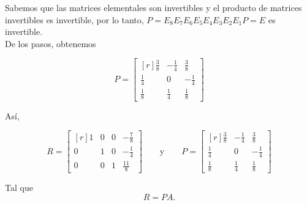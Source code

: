 \begin{enumerate}
	Sabemos que las matrices elementales son invertibles y el producto de matrices invertibles es invertible, por lo tanto, $P=E_8E_7E_6E_5E_4E_3E_2E_1P=E$ es invertible.\\

	De los pasos, obtenemos

	$$P=\begin{bmatrix*}[r]
	    \frac{3}{8} & -\frac{1}{4} & \frac{3}{8}\\
	    \frac{1}{4} & 0 & -\frac{1}{4}\\
	    \frac{1}{8} & \frac{1}{4} & \frac{1}{8}
	\end{bmatrix*}$$

	Así,

	$$R=\begin{bmatrix*}[r]
	    1 & 0 & 0 & -\frac{7}{8}\\
	    0 & 1 & 0 & -\frac{1}{4}\\
	    0 & 0 & 1 & \frac{11}{8}
	\end{bmatrix*} \qquad \mbox{y}\qquad 
	P=\begin{bmatrix*}[r]
	    \frac{3}{8} & -\frac{1}{4} & \frac{3}{8}\\
	    \frac{1}{4} & 0 & -\frac{1}{4}\\
	    \frac{1}{8} & \frac{1}{4} & \frac{1}{8}
	\end{bmatrix*}$$

	Tal que $$R=PA.$$\\
	


\end{enumerate}
